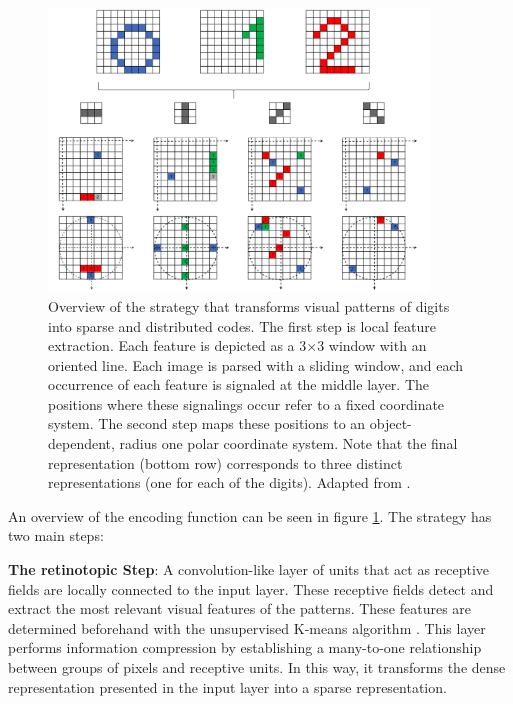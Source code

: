 \documentclass[runningheads]{llncs}
\begin{document}
\begin{figure}[h]
    \centering
    \includegraphics[width=0.9\textwidth]{img/sacouto1.png}
    \caption{Overview of the strategy that transforms visual patterns of digits
    into sparse and distributed codes. The first step is local feature
    extraction. Each feature is depicted as a 3×3 window with an oriented line.
    Each image is parsed with a sliding window, and each occurrence of each
    feature is signaled at the middle layer. The positions where these signalings
    occur refer to a fixed coordinate system. The second step maps these
    positions to an object-dependent, radius one polar coordinate system. Note
    that the final representation (bottom row) corresponds to three distinct
    representations (one for each of the digits). Adapted from \cite{sa2020storing}.}
\label{fig:sacouto1}
\end{figure}

An overview of the encoding function can be seen in figure \ref{fig:sacouto1}. The strategy has two main steps:

\textbf{The retinotopic Step}: A convolution-like layer \cite{lecun1995convolutional} of units that act as receptive fields are locally connected to the input layer. These receptive fields detect and extract the most relevant visual features of the patterns. These features are determined beforehand with the unsupervised K-means algorithm \cite{lloyd1982least,wu2008top}. This layer performs information compression by establishing a many-to-one relationship between groups of pixels and receptive units. In this way, it transforms the dense representation presented in the input layer into a sparse representation.
\end{document}
